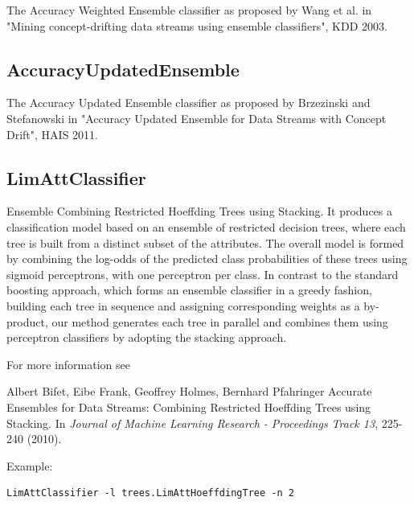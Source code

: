 \documentclass[a4paper,12pt,twoside]{book}
\begin{document}
  The Accuracy Weighted Ensemble classifier as proposed 
  by Wang et al. in "Mining concept-drifting data streams using ensemble classifiers",
   KDD 2003.

\subsection{AccuracyUpdatedEnsemble}

  The Accuracy Updated Ensemble classifier as proposed 
  by Brzezinski and Stefanowski in "Accuracy Updated Ensemble for Data Streams 
  with Concept Drift", HAIS 2011.

\subsection{LimAttClassifier}


  Ensemble Combining Restricted Hoeffding Trees using Stacking.
  It produces a classification model based on an
  ensemble of restricted decision trees, where each tree is built from a
  distinct subset of the attributes. The overall model is formed by
  combining the log-odds of the predicted class probabilities of these trees
  using sigmoid perceptrons, with one perceptron per class.
  In contrast to the standard boosting approach,
  which forms an ensemble classifier in a greedy fashion, building each tree in
  sequence and assigning corresponding weights as a by-product, our
  method generates each tree in parallel and combines them using perceptron
  classifiers by adopting the stacking approach.
 
  For more information see
 
 \begin{itemize}
Albert Bifet, Eibe Frank, Geoffrey Holmes, Bernhard Pfahringer
\newblock Accurate Ensembles for Data Streams: Combining Restricted Hoeffding Trees using Stacking.
\newblock In {\em Journal of Machine Learning Research - Proceedings Track 13},   225-240 (2010).
\end{itemize}
 
Example:
\begin{footnotesize}\begin{verbatim}
LimAttClassifier -l trees.LimAttHoeffdingTree -n 2
\end{verbatim}\end{footnotesize}
\end{document}
